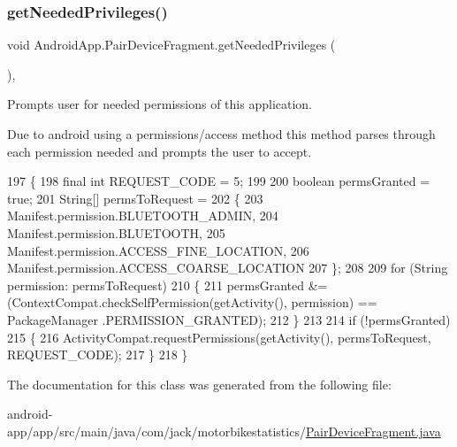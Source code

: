 \subsubsection{\texorpdfstring{get\+Needed\+Privileges()}{getNeededPrivileges()}}
{\footnotesize\ttfamily void Android\+App.\+Pair\+Device\+Fragment.\+get\+Needed\+Privileges (\begin{DoxyParamCaption}{ }\end{DoxyParamCaption})\hspace{0.3cm}{\ttfamily [inline]}, {\ttfamily [private]}}



Prompts user for needed permissions of this application. 

Due to android using a permissions/access method this method parses through each permission needed and prompts the user to accept. 
\begin{DoxyCode}
197     \{
198         \textcolor{keyword}{final} \textcolor{keywordtype}{int} REQUEST\_CODE = 5;
199 
200         \textcolor{keywordtype}{boolean} permsGranted = \textcolor{keyword}{true};
201         String[] permsToRequest =
202                 \{
203                         Manifest.permission.BLUETOOTH\_ADMIN,
204                         Manifest.permission.BLUETOOTH,
205                         Manifest.permission.ACCESS\_FINE\_LOCATION,
206                         Manifest.permission.ACCESS\_COARSE\_LOCATION
207                 \};
208 
209         \textcolor{keywordflow}{for} (String permission: permsToRequest)
210         \{
211             permsGranted &= (ContextCompat.checkSelfPermission(getActivity(), permission) == PackageManager
      .PERMISSION\_GRANTED);
212         \}
213 
214         \textcolor{keywordflow}{if} (!permsGranted)
215         \{
216             ActivityCompat.requestPermissions(getActivity(), permsToRequest, REQUEST\_CODE);
217         \}
218     \}
\end{DoxyCode}


The documentation for this class was generated from the following file\+:\begin{DoxyCompactItemize}
\item 
android-\/app/app/src/main/java/com/jack/motorbikestatistics/\hyperlink{_pair_device_fragment_8java}{Pair\+Device\+Fragment.\+java}\end{DoxyCompactItemize}
